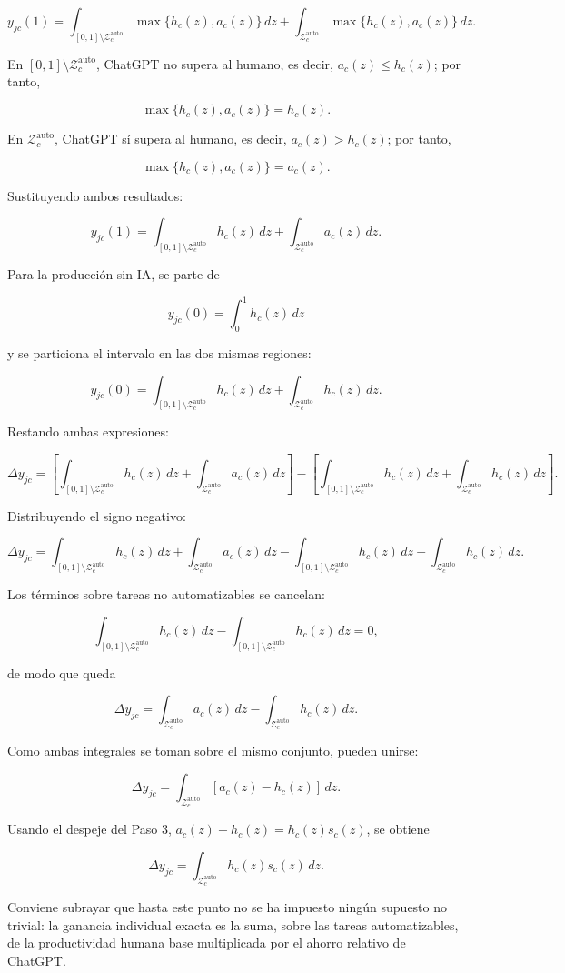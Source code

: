 \documentclass[12pt,a4paper]{article}
\newcommand{\Zauto}{\mathcal{Z}^{\mathrm{auto}}_c}
\newcommand{\dd}{\,dz}
\begin{document}
\[
y_{jc}(1)
=\int_{[0,1]\setminus\Zauto}\max\{h_c(z),a_c(z)\}\dd
+\int_{\Zauto}\max\{h_c(z),a_c(z)\}\dd.
\]

En $[0,1]\setminus\Zauto$, ChatGPT no supera al humano, es decir, $a_c(z)\leq h_c(z)$; por tanto,

\[
\max\{h_c(z),a_c(z)\}=h_c(z).
\]

En $\Zauto$, ChatGPT sí supera al humano, es decir, $a_c(z)>h_c(z)$; por tanto,

\[
\max\{h_c(z),a_c(z)\}=a_c(z).
\]

Sustituyendo ambos resultados:

\[
y_{jc}(1)
=\int_{[0,1]\setminus\Zauto}h_c(z)\dd
+\int_{\Zauto}a_c(z)\dd.
\]

Para la producción sin IA, se parte de

\[
y_{jc}(0)=\int_0^1 h_c(z)\dd
\]

y se particiona el intervalo en las dos mismas regiones:

\[
y_{jc}(0)
=\int_{[0,1]\setminus\Zauto}h_c(z)\dd
+\int_{\Zauto}h_c(z)\dd.
\]

Restando ambas expresiones:

\[
\Delta y_{jc}
=
\left[
\int_{[0,1]\setminus\Zauto}h_c(z)\dd
+\int_{\Zauto}a_c(z)\dd
\right]
-
\left[
\int_{[0,1]\setminus\Zauto}h_c(z)\dd
+\int_{\Zauto}h_c(z)\dd
\right].
\]

Distribuyendo el signo negativo:

\[
\Delta y_{jc}
=
\int_{[0,1]\setminus\Zauto}h_c(z)\dd
+\int_{\Zauto}a_c(z)\dd
-\int_{[0,1]\setminus\Zauto}h_c(z)\dd
-\int_{\Zauto}h_c(z)\dd.
\]

Los términos sobre tareas no automatizables se cancelan:

\[
\int_{[0,1]\setminus\Zauto}h_c(z)\dd
-\int_{[0,1]\setminus\Zauto}h_c(z)\dd
=0,
\]

de modo que queda

\[
\Delta y_{jc}
=
\int_{\Zauto}a_c(z)\dd
-\int_{\Zauto}h_c(z)\dd.
\]

Como ambas integrales se toman sobre el mismo conjunto, pueden unirse:

\[
\Delta y_{jc}
=
\int_{\Zauto}\left[a_c(z)-h_c(z)\right]\dd.
\]

Usando el despeje del Paso 3, $a_c(z)-h_c(z)=h_c(z)s_c(z)$, se obtiene

\[
\Delta y_{jc}
=
\int_{\Zauto}h_c(z)s_c(z)\dd.
\]

Conviene subrayar que hasta este punto no se ha impuesto ningún supuesto no trivial: la ganancia individual exacta es la suma, sobre las tareas automatizables, de la productividad humana base multiplicada por el ahorro relativo de ChatGPT.
\end{document}
